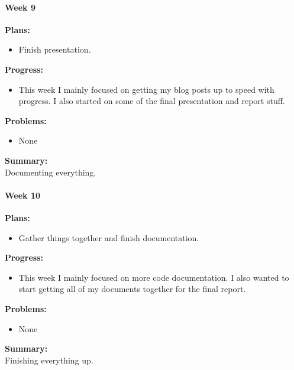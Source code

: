 \paragraph{Week 9}
\begin{adjustwidth}{2.5em}{0pt}
    \vspace{-0.5cm}\textbf{Plans:}
    \vspace{-0.5cm}
    \begin{itemize}
        \item Finish presentation. 
    \end{itemize} 
    \vspace{-0.3cm}\textbf{Progress:}
    \vspace{-0.5cm}
    \begin{itemize}
        \item This week I mainly focused on getting my blog posts up to speed with progress. I also started on some of the final presentation and report stuff.
    \end{itemize} 
    \vspace{-0.3cm}\textbf{Problems:}
    \vspace{-0.5cm}
    \begin{itemize}
        \item None
    \end{itemize}  
    \vspace{-0.3cm}\noindent\textbf{Summary:}\\
    \noindent Documenting everything. 
\end{adjustwidth} 
\paragraph{Week 10}
\begin{adjustwidth}{2.5em}{0pt}
    \vspace{-0.5cm}\textbf{Plans:}
    \vspace{-0.5cm}
    \begin{itemize}
        \item Gather things together and finish documentation. 
    \end{itemize} 
    \vspace{-0.3cm}\textbf{Progress:}
    \vspace{-0.5cm}
    \begin{itemize}
        \item This week I mainly focused on more code documentation. I also wanted to start getting all of my documents together for the final report. 
    \end{itemize} 
    \vspace{-0.3cm}\textbf{Problems:}
    \vspace{-0.5cm}
    \begin{itemize}
        \item None
    \end{itemize}  
    \vspace{-0.3cm}\noindent\textbf{Summary:}\\
    \noindent Finishing everything up.
\end{adjustwidth} 